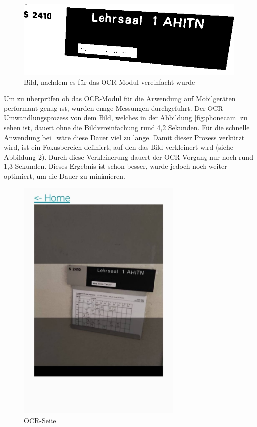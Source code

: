 \begin{figure}
    \centering
    \includegraphics[width=120mm]{media/OCR/compressed}
    \caption{Bild, nachdem es für das OCR-Modul vereinfacht wurde}
    \label{ocroptimised}
\end{figure}


\pagebreak

\label{sec:ocrmessung}

Um zu überprüfen ob das OCR-Modul für die Anwendung auf Mobilgeräten performant genug ist, wurden einige Messungen durchgeführt. Der OCR Umwandlungsprozess von dem Bild, welches in der Abbildung \ref{fig:phonecam} zu sehen ist, dauert ohne die Bildvereinfachung rund 4,2 Sekunden. Für die schnelle Anwendung bei \ZELIA\ wäre diese Dauer viel zu lange. Damit dieser Prozess verkürzt wird, ist ein Fokusbereich definiert, auf den das Bild verkleinert wird (siehe Abbildung \ref{fig:ocrfocus}). Durch diese Verkleinerung dauert der OCR-Vorgang nur noch rund 1,3 Sekunden. Dieses Ergebnis ist schon besser, wurde jedoch noch weiter optimiert, um die Dauer zu minimieren. 

\begin{figure}[H]
    \centering
    \includegraphics[width=80mm]{media/WebComponents/OCRSeite_light.jpg}
    \caption{OCR-Seite}
    \label{fig:ocrfocus}
\end{figure}

